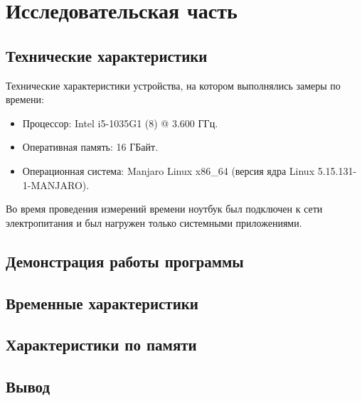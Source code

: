 \chapter{Исследовательская часть}

\section{Технические характеристики}

Технические характеристики устройства, на котором выполнялись замеры по времени:

\begin{itemize}
    \item Процессор: Intel i5-1035G1 (8) @ 3.600 ГГц.
    \item Оперативная память: 16 ГБайт.
    \item Операционная система: Manjaro Linux x86\_64 (версия ядра Linux 5.15.131-1-MANJARO).
\end{itemize}

Во время проведения измерений времени ноутбук был подключен к сети электропитания и был нагружен только системными приложениями.

\section{Демонстрация работы программы}

\section{Временные характеристики}

\section{Характеристики по памяти}

\section{Вывод}
